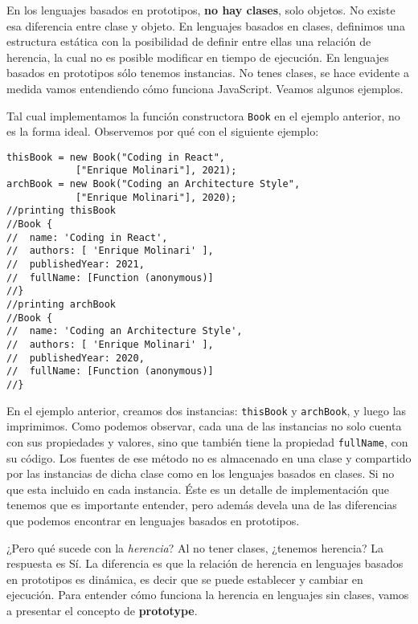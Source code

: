 \documentclass[a4paper, oneside, titlepage, 12pt]{paper}
\begin{document}
En los lenguajes basados en prototipos, \textbf{no hay clases}, solo objetos. No existe esa diferencia entre clase y objeto. En lenguajes basados en clases, definimos una estructura estática con la posibilidad de definir entre ellas una relación de herencia, la cual no es posible modificar en tiempo de ejecución. En lenguajes basados en prototipos sólo tenemos instancias. No tenes clases, se hace evidente a medida vamos entendiendo cómo funciona JavaScript. Veamos algunos ejemplos.
\newline

Tal cual implementamos la función constructora \texttt{Book} en el ejemplo anterior, no es la forma ideal. Observemos por qué con el siguiente ejemplo:

\begin{verbatim}
thisBook = new Book("Coding in React", 
			["Enrique Molinari"], 2021);
archBook = new Book("Coding an Architecture Style", 
			["Enrique Molinari"], 2020);
//printing thisBook
//Book {
//  name: 'Coding in React',
//  authors: [ 'Enrique Molinari' ],
//  publishedYear: 2021,
//  fullName: [Function (anonymous)]
//}
//printing archBook
//Book {
//  name: 'Coding an Architecture Style',
//  authors: [ 'Enrique Molinari' ],
//  publishedYear: 2020,
//  fullName: [Function (anonymous)]
//}
\end{verbatim}

En el ejemplo anterior, creamos dos instancias: \texttt{thisBook} y \texttt{archBook}, y luego las imprimimos. Como podemos observar, cada una de las instancias no solo cuenta con sus propiedades y valores, sino que también tiene la propiedad \texttt{fullName}, con su código. Los fuentes de ese método no es almacenado en una clase y compartido por las instancias de dicha clase como en los lenguajes basados en clases. Si no que esta incluido en cada instancia. Éste es un detalle de implementación que tenemos que es importante entender, pero además devela una de las diferencias que podemos encontrar en lenguajes basados en prototipos.
\newline

¿Pero qué sucede con la \textit{herencia}? Al no tener clases, ¿tenemos herencia? La respuesta es Sí. La diferencia es que la relación de herencia en lenguajes basados en prototipos es dinámica, es decir que se puede establecer y cambiar en ejecución. Para entender cómo funciona la herencia en lenguajes sin clases, vamos a presentar el concepto de \textbf{prototype}. 
\newline
\end{document}
